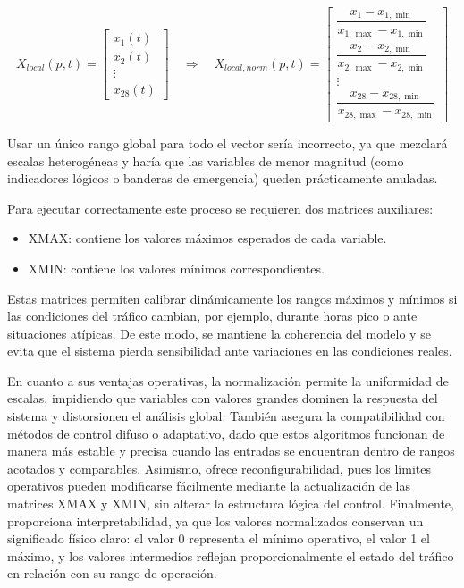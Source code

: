 \documentclass[12pt,a4paper,oneside]{report}
\begin{document}
\begin{equation}
X_{local}(p,t) =
\begin{bmatrix}
x_{1}(t)\\ x_{2}(t)\\ \vdots\\ x_{28}(t)
\end{bmatrix}
\quad\Longrightarrow\quad
X_{local,norm}(p,t) =
\begin{bmatrix}
\dfrac{x_{1} - x_{1,\min}}{x_{1,\max} - x_{1,\min}}\\[8pt]
\dfrac{x_{2} - x_{2,\min}}{x_{2,\max} - x_{2,\min}}\\[4pt]
\vdots\\[4pt]
\dfrac{x_{28} - x_{28,\min}}{x_{28,\max} - x_{28,\min}}
\end{bmatrix}
\end{equation}

Usar un único rango global para todo el vector sería incorrecto, ya que mezclará escalas heterogéneas y haría que las variables de menor magnitud (como indicadores lógicos o banderas de emergencia) queden prácticamente anuladas.

Para ejecutar correctamente este proceso se requieren dos matrices auxiliares:

\begin{itemize}
\item
  XMAX\hspace{0pt}: contiene los valores máximos esperados de cada variable.
\item
  XMIN\hspace{0pt}: contiene los valores mínimos correspondientes.
\end{itemize}

Estas matrices permiten calibrar dinámicamente los rangos máximos y mínimos si las condiciones del tráfico cambian, por ejemplo, durante horas pico o ante situaciones atípicas. De este modo, se mantiene la coherencia del modelo y se evita que el sistema pierda sensibilidad ante variaciones en las condiciones reales.

En cuanto a sus ventajas operativas, la normalización permite la uniformidad de escalas, impidiendo que variables con valores grandes dominen la respuesta del sistema y distorsionen el análisis global. También asegura la compatibilidad con métodos de control difuso o adaptativo, dado que estos algoritmos funcionan de manera más estable y precisa cuando las entradas se encuentran dentro de rangos acotados y comparables. Asimismo, ofrece reconfigurabilidad, pues los límites operativos pueden modificarse fácilmente mediante la actualización de las matrices XMAX y XMIN\hspace{0pt}, sin alterar la estructura lógica del control. Finalmente, proporciona interpretabilidad, ya que los valores normalizados conservan un significado físico claro: el valor 0 representa el mínimo operativo, el valor 1 el máximo, y los valores intermedios reflejan proporcionalmente el estado del tráfico en relación con su rango de operación.
\end{document}
